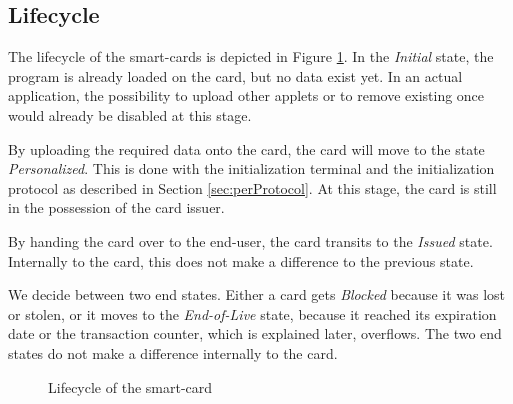 \subsection{Lifecycle}
The lifecycle of the smart-cards is depicted in Figure \ref{fig:lifecycle}.
In the \emph{Initial} state, the program is already loaded on the card, but no data exist yet.
In an actual application, the possibility to upload other applets or to remove existing once would already be disabled at this stage.

By uploading the required data onto the card, the card will move to the state \emph{Personalized}.
This is done with the initialization terminal and the initialization protocol as described in Section \ref{sec:perProtocol}.
At this stage, the card is still in the possession of the card issuer.

By handing the card over to the end-user, the card transits to the \emph{Issued} state.
Internally to the card, this does not make a difference to the previous state.

We decide between two end states.
Either a card gets \emph{Blocked} because it was lost or stolen, or it moves to the \emph{End-of-Live} state, because it reached its expiration date or the transaction counter, which is explained later, overflows.
The two end states do not make a difference internally to the card.

\begin{figure}[h]
    \centering
    
    \caption{Lifecycle of the smart-card}
    \label{fig:lifecycle}
\end{figure}


